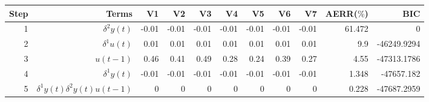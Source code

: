 \begin{tabular}{rrrrrrrrrrr}
Step & Terms & V1 & V2 & V3 & V4 & V5 & V6 & V7 & AERR($\%$) & BIC \\ 
\hline 
1 & $\delta^2 y(t)$ & -0.01 & -0.01 & -0.01 & -0.01 & -0.01 & -0.01 & -0.01 & 61.472 & 0 \\ 
2 & $\delta^1 u(t)$ & 0.01 & 0.01 & 0.01 & 0.01 & 0.01 & 0.01 & 0.01 & 9.9 & -46249.9294 \\ 
3 & $u(t-1)$ & 0.46 & 0.41 & 0.49 & 0.28 & 0.24 & 0.39 & 0.27 & 4.55 & -47313.1786 \\ 
4 & $\delta^1 y(t)$ & -0.01 & -0.01 & -0.01 & -0.01 & -0.01 & -0.01 & -0.01 & 1.348 & -47657.182 \\ 
5 & $\delta^1 y(t)\delta^2 y(t)u(t-1)$ & 0 & 0 & 0 & 0 & 0 & 0 & 0 & 0.228 & -47687.2959 \\ 
\hline 
\end{tabular}